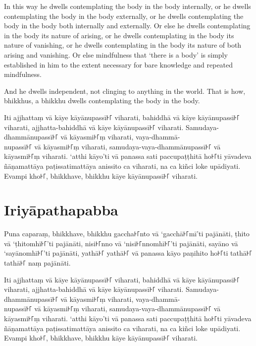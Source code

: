 In this way he dwells contemplating the body in the body internally, or he
dwells contemplating the body in the body externally, or he dwells contemplating
the body in the body both internally and externally. Or else he dwells
contemplating in the body its nature of arising, or he dwells contemplating in
the body its nature of vanishing, or he dwells contemplating in the body its
nature of both arising and vanishing. Or else mindfulness that ‘there is a body’
is simply established in him to the extent necessary for bare knowledge and
repeated mindfulness.

And he dwells independent, not clinging to anything in the world. That is how,
bhikkhus, a bhikkhu dwells contemplating the body in the body.


\paliPage

Iti ajjhattaṃ vā kāye kāyānupassī꜔꜒ viharati, bahiddhā vā kāye kāyānupassī꜔꜒
viharati, ajjhatta-bahiddhā vā kāye kāyānupassī꜔꜒ viharati. Samudaya-dhammānupassī꜔꜒
vā kāyasmi꜔꜒ṃ viharati, vaya-dhammā-\\
nupassī꜔꜒ vā kāyasmi꜔꜒ṃ viharati, samudaya-vaya-dhammānupassī꜔꜒ vā kāyasmi꜔꜒ṃ viharati.
‘atthi kāyo’ti vā panassa sati paccupaṭṭhitā ho꜔꜒ti yāvadeva ñāṇamattāya
paṭissatimattāya anissito ca viharati, na ca kiñci loke upādiyati. Evampi kho꜔꜒,
bhikkhave, bhikkhu kāye kāyānupassī꜔꜒ viharati.


\section*{Iriyāpathapabba}

Puna caparaṃ, bhikkhave, bhikkhu gaccha꜔꜒nto vā ‘gacchā꜔꜒mī’ti pajānāti, ṭhito vā
‘ṭhitomhī꜔꜒’ti pajānāti, nisi꜔꜒nno vā ‘nisi꜔꜒nnomhī꜔꜒’ti pajānāti, sayāno vā
‘sayānomhī꜔꜒’ti pajānāti, yathā꜔꜒ yathā꜔꜒ vā panassa kāyo paṇihito ho꜔꜒ti tathā꜔꜒ tathā꜔꜒
naṃ pajānāti.

Iti ajjhattaṃ vā kāye kāyānupassī꜔꜒ viharati, bahiddhā vā kāye kāyānupassī꜔꜒
viharati, ajjhatta-bahiddhā vā kāye kāyānupassī꜔꜒ viharati. Samudaya-dhammānupassī꜔꜒
vā kāyasmi꜔꜒ṃ viharati, vaya-dhammā-\\
nupassī꜔꜒ vā kāyasmi꜔꜒ṃ viharati, samudaya-vaya-dhammānupassī꜔꜒ vā kāyasmi꜔꜒ṃ viharati.
‘atthi kāyo’ti vā panassa sati paccupaṭṭhitā ho꜔꜒ti yāvadeva ñāṇamattāya
paṭissatimattāya anissito ca viharati, na ca kiñci loke upādiyati. Evampi kho꜔꜒,
bhikkhave, bhikkhu kāye kāyānupassī꜔꜒ viharati.


